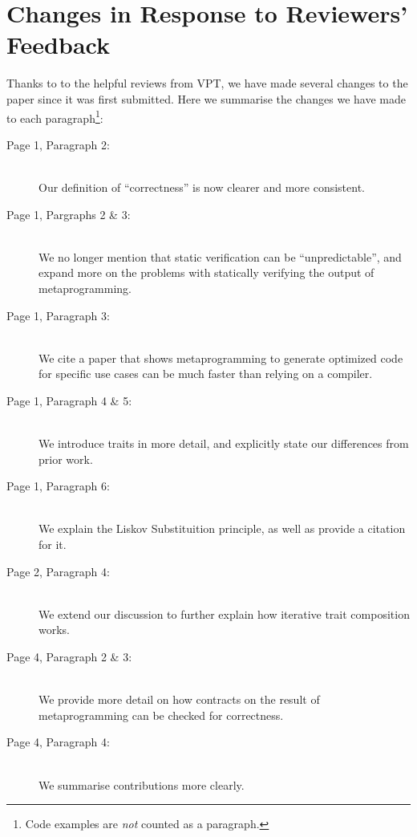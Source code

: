 \section{Changes in Response to Reviewers' Feedback}
Thanks to to the helpful reviews from VPT, we have made several changes to the paper since it was first submitted. Here we summarise the changes we have made to each paragraph\footnote{Code examples are \emph{not} counted as a paragraph.}:

\def\n{\ifvmode\indent\fi\\}%

\begin{description}
\item[Page 1, Paragraph 2:]\n
Our definition of ``correctness'' is now clearer and more consistent.

\item [Page 1, Pargraphs 2 \& 3:]\n
We no longer mention that static verification can be ``unpredictable'', and expand more on the problems with statically verifying the output of metaprogramming.
\item[Page 1, Paragraph 3:]\n We cite a paper that shows metaprogramming to generate optimized code for specific use cases can be much faster than relying on a compiler.
\item[Page 1, Paragraph 4 \& 5:]\n We introduce traits in more detail, and explicitly state our differences from prior work.
\item[Page 1, Paragraph 6:]\n We explain the Liskov Substituition principle, as well as provide a citation for it.
\item[Page 2, Paragraph 4:]\n We extend our discussion to further explain how iterative trait composition works.

\item[Page 4, Paragraph 2 \& 3:]\n We provide more detail on how contracts on the result of metaprogramming can be checked for correctness.
\item[Page 4, Paragraph 4:]\n We summarise contributions more clearly.
\end{description}